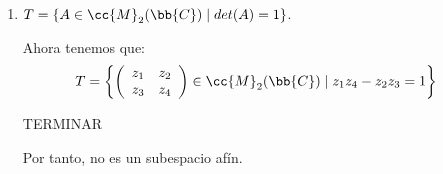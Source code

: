 \begin{ejercicio}
\begin{enumerate}
        \item $T = \{A \in \cc{M}_2(\bb{C}) \mid det(A) = 1\}$.

        Ahora tenemos que:
        \begin{equation*}\begin{split}
            T&=\left\{\left(\begin{array}{cc}
                z_1 & z_2 \\
                z_3 & z_4
            \end{array}\right) \in \cc{M}_2(\bb{C}) \mid z_1z_4-z_2z_3=1\right\}
        \end{split}\end{equation*}

        TERMINAR
        
        Por tanto, no es un subespacio afín.
    \end{enumerate}
\end{ejercicio}


